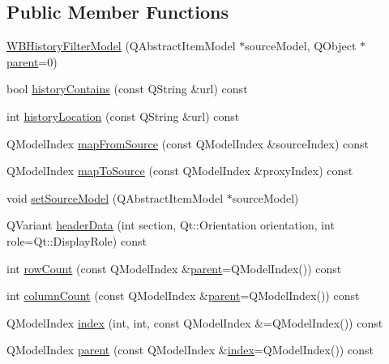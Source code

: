 \subsection*{Public Member Functions}
\begin{DoxyCompactItemize}
\item 
\hyperlink{class_w_b_history_filter_model_a7e365109a2414ffe2d9de80c60ad4c43}{W\-B\-History\-Filter\-Model} (Q\-Abstract\-Item\-Model $\ast$source\-Model, Q\-Object $\ast$\hyperlink{class_w_b_history_filter_model_a494793067e4585e5f31b4edda35305cf}{parent}=0)
\item 
bool \hyperlink{class_w_b_history_filter_model_af43e01b4dabec4cea16b2ae39fa34953}{history\-Contains} (const Q\-String \&url) const 
\item 
int \hyperlink{class_w_b_history_filter_model_aaa886ebf372f8f29ff9cc2861b327338}{history\-Location} (const Q\-String \&url) const 
\item 
Q\-Model\-Index \hyperlink{class_w_b_history_filter_model_ae8e71451d931f055c0811ab2873811e7}{map\-From\-Source} (const Q\-Model\-Index \&source\-Index) const 
\item 
Q\-Model\-Index \hyperlink{class_w_b_history_filter_model_acb8a8e298da80817fa48b5187e380189}{map\-To\-Source} (const Q\-Model\-Index \&proxy\-Index) const 
\item 
void \hyperlink{class_w_b_history_filter_model_ae6fb2fe854b960e0a8bca4ab23d5e9e5}{set\-Source\-Model} (Q\-Abstract\-Item\-Model $\ast$source\-Model)
\item 
Q\-Variant \hyperlink{class_w_b_history_filter_model_a032147a6ffb38ba8773ef504d548235d}{header\-Data} (int section, Qt\-::\-Orientation orientation, int role=Qt\-::\-Display\-Role) const 
\item 
int \hyperlink{class_w_b_history_filter_model_aecaf7d67cb84d0b9fb4d66cc10660892}{row\-Count} (const Q\-Model\-Index \&\hyperlink{class_w_b_history_filter_model_a494793067e4585e5f31b4edda35305cf}{parent}=Q\-Model\-Index()) const 
\item 
int \hyperlink{class_w_b_history_filter_model_a6046c2b995db0e2e81003d3c63092220}{column\-Count} (const Q\-Model\-Index \&\hyperlink{class_w_b_history_filter_model_a494793067e4585e5f31b4edda35305cf}{parent}=Q\-Model\-Index()) const 
\item 
Q\-Model\-Index \hyperlink{class_w_b_history_filter_model_a14fdaea193d5fb1e3994f882c58fccb9}{index} (int, int, const Q\-Model\-Index \&=Q\-Model\-Index()) const 
\item 
Q\-Model\-Index \hyperlink{class_w_b_history_filter_model_a494793067e4585e5f31b4edda35305cf}{parent} (const Q\-Model\-Index \&\hyperlink{class_w_b_history_filter_model_a14fdaea193d5fb1e3994f882c58fccb9}{index}=Q\-Model\-Index()) const 

\end{DoxyCompactItemize}
